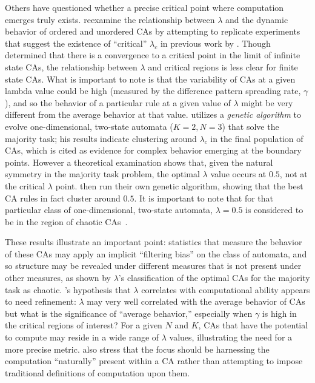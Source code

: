 \documentclass[a4paper,11pt]{report}
\begin{document}
Others have questioned whether a precise critical point where computation emerges truly exists. \citeauthor{mi93} reexamine the relationship between $\lambda$ and the dynamic behavior of ordered and unordered CAs by attempting to replicate experiments that suggest the existence of ``critical'' $\lambda_c$ in previous work by \citeauthor{pa88}. Though \citeauthor{wo90} determined that there is a convergence to a critical point in the limit of infinite state CAs, the relationship between $\lambda$ and critical regions is less clear for finite state CAs. What is important to note is that the variability of CAs at a given lambda value could be high (measured by the difference pattern spreading rate, $\gamma$), and so the behavior of a particular rule at a given value of $\lambda$ might be very different from the average behavior at that value. \citeauthor{pa88} utilizes a \textit{genetic algorithm} to evolve one-dimensional, two-state automata ($K=2, N=3$) that solve the majority task; his results indicate clustering around $\lambda_c$ in the final population of CAs, which is cited as evidence for complex behavior emerging at the boundary points. However a theoretical examination shows that, given the natural symmetry in the majority task problem, the optimal $\lambda$ value occurs at $0.5$, not at the critical $\lambda$ point. \citeauthor{mi93} then run their own genetic algorithm, showing that the best CA rules in fact cluster around $0.5$. It is important to note that for that particular class of one-dimensional, two-state automata, $\lambda = 0.5$ is considered to be in the region of chaotic CAs~\cite{mi93}. 

These results illustrate an important point: statistics that measure the behavior of these CAs may apply an implicit ``filtering bias'' on the class of automata, and so structure may be revealed under different measures that is not present under other measures, as shown by $\lambda$'s classification of the optimal CAs for the majority task as chaotic. \citeauthor{la90}'s hypothesis that $\lambda$ correlates with computational ability appears to need refinement: $\lambda$ may very well correlated with the average behavior of CAs but what is the significance of  ``average behavior,''  especially when $\gamma$ is high in the critical regions of interest? For a given $N$ and $K$, CAs that have the potential to compute may reside in a wide range of $\lambda$ values, illustrating the need for a more precise metric. \citeauthor{mi93} also stress that the focus should be harnessing the computation ``naturally'' present within a CA rather than attempting to impose traditional definitions of computation upon them. 
\end{document}
